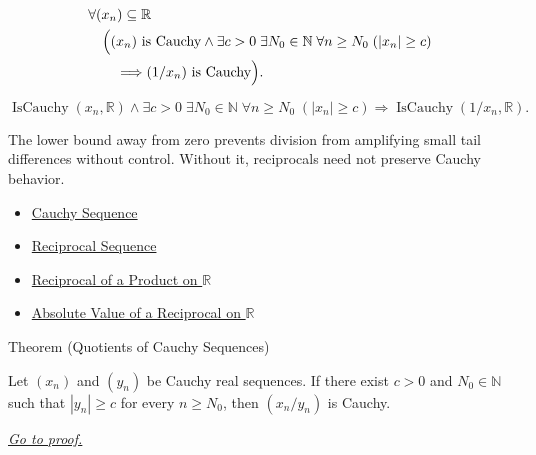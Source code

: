\begin{remark*}
\[
\begin{aligned}
&\forall (x_n)\subseteq\mathbb{R}\\
&\quad
\Bigl(
  (x_n)\text{ is Cauchy}
  \land
  \exists c>0\;\exists N_0\in\mathbb{N}\;\forall n\ge N_0\;( |x_n|\ge c )\\
&\qquad\Longrightarrow
  (1/x_n)\text{ is Cauchy}
\Bigr).
\end{aligned}
\]
\end{remark*}

\begin{remark*}
\[
\operatorname{IsCauchy}(x_n,\mathbb{R})
\land
\exists c>0\;\exists N_0\in\mathbb{N}\;\forall n\ge N_0\;( |x_n|\ge c )
\Longrightarrow
\operatorname{IsCauchy}(1/x_n,\mathbb{R}).
\]
\end{remark*}

\begin{remark*}[Interpretation]
The lower bound away from zero prevents division from amplifying small tail
differences without control. Without it, reciprocals need not preserve Cauchy
behavior.
\end{remark*}

\begin{dependencies}
\begin{itemize}
  \item \hyperref[def:cauchy-sequence]{Cauchy Sequence}
  \item \hyperref[def:reciprocal-sequence]{Reciprocal Sequence}
  \item \hyperref[thm:reciprocal-of-product-on-r]{Reciprocal of a Product on $\mathbb{R}$}
  \item \hyperref[thm:absolute-value-of-reciprocal-r]{Absolute Value of a Reciprocal on $\mathbb{R}$}
\end{itemize}
\end{dependencies}


\begin{theorembox}{Theorem (Quotients of Cauchy Sequences)}
\begin{theorem}
\label{thm:quotient-cauchy-sequences}
Let $(x_n)$ and $(y_n)$ be Cauchy real sequences. If there exist $c>0$
and $N_0\in\mathbb{N}$ such that $|y_n|\ge c$ for every $n\ge N_0$,
then $(x_n/y_n)$ is Cauchy.

\smallskip
\noindent
\hyperref[prf:quotient-cauchy-sequences]{\textit{Go to proof.}}
\end{theorem}
\end{theorembox}

